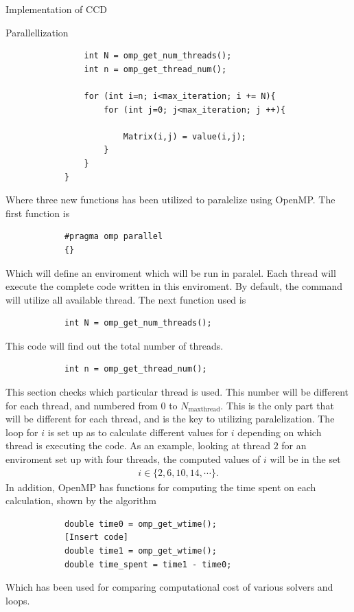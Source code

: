 \documentclass[twoside,english]{uiofysmaster}
\begin{document}
\begin{chapter}{Implementation of CCD}
\begin{section}{Parallellization}
\begin{lstlisting}
				int N = omp_get_num_threads();
				int n = omp_get_thread_num();

				for (int i=n; i<max_iteration; i += N){
					for (int j=0; j<max_iteration; j ++){

						Matrix(i,j) = value(i,j);
					}
				}
			}
		\end{lstlisting}
		Where three new functions has been utilized to paralelize using OpenMP. The first function is 
		\begin{lstlisting}
			#pragma omp parallel
			{}
		\end{lstlisting}
		Which will define an enviroment which will be run in paralel. Each thread will execute the complete code written in this enviroment. By default, the command will utilize all available thread. The next function used is
		\begin{lstlisting}
			int N = omp_get_num_threads();
		\end{lstlisting}
		This code will find out the total number of threads. 
		\begin{lstlisting}
			int n = omp_get_thread_num();
		\end{lstlisting}
		This section checks which particular thread is used. This number will be different for each thread, and numbered from $0$ to $N_{\text{maxthread}}$. This is the only part that will be different for each thread, and is the key to utilizing paralelization. The loop for $i$ is set up as to calculate different values for $i$ depending on which thread is executing the code. As an example, looking at thread $2$ for an enviroment set up with four threads, the computed values of $i$ will be in the set
		\begin{align}
			i \in \{2, 6, 10, 14, \cdots \}.
		\end{align}
		In addition, OpenMP has functions for computing the time spent on each calculation, shown by the algorithm
		\begin{lstlisting}
			double time0 = omp_get_wtime();
			[Insert code]
			double time1 = omp_get_wtime();
			double time_spent = time1 - time0;
		\end{lstlisting}
		Which has been used for comparing computational cost of various solvers and loops.
	\end{section}

\end{chapter}
\end{document}
